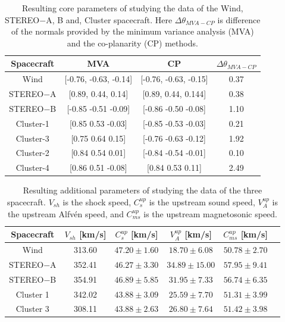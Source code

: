 \documentclass[draft]{agujournal2019}
\begin{document}
\begin{table}[h]
 \centering
 \caption{Resulting core parameters of studying the data of the Wind, STEREO$-$A, B and, Cluster spacecraft. Here $\Delta\theta_{MVA-CP}$ is difference of the normals provided by the minimum variance analysis (MVA) and the co-planarity (CP) methods.\label{tab:core2}}
\begin{tabular}{cccc}
\hline
Spacecraft & MVA & CP & $\Delta\theta_{MVA-CP}$\\
 \hline
Wind & [-0.76, -0.63, -0.14] & [-0.76, -0.63, -0.15] & 0.37 \\
STEREO$-$A & [0.89, 0.44, 0.14] & [0.89, 0.44, 0.144] & 0.38 \\
STEREO$-$B & [-0.85 -0.51 -0.09] &   [-0.86 -0.50 -0.08] & 1.10  \\
Cluster-1 & [0.85 0.53 -0.03] &   [-0.85 -0.53 -0.03] & 0.21  \\
Cluster-3 & [0.75 0.64 0.15] &   [-0.76 -0.63 -0.12] & 1.92  \\
 Cluster-2 & [0.84 0.54 0.01] &   [-0.84 -0.54 -0.01] & 0.10  \\
 Cluster-4 & [0.86 0.51 -0.08] &   [0.84 0.53 0.11] & 2.49  \\
 \end{tabular}
\end{table}

\pagebreak

\begin{table}[h]
\centering
\caption{Resulting additional parameters of studying the data of the three spacecraft. $V_{sh}$ is the shock speed, $C^{up}_s$ is the upstream sound speed, $V^{up}_A$ is the upstream Alfvén speed, and $C^{up}_{ms}$ is the upstream magnetosonic speed. \label{tab:core3}}
\begin{tabular}{cccccc}
\hline
Spacecraft & $V_{sh}$ [km/s] & $C^{up}_s$ [km/s]  & $V^{up}_A$ [km/s] & $C^{up}_{ms}$ [km/s]  \\
 \hline
Wind & 313.60 & $47.20\pm 1.60$     & $18.70\pm 6.08$      & $50.78\pm 2.70$  \\
 STEREO$-$A  & 352.41 & $46.27\pm 3.30$     & $34.89\pm 15.00$      & $57.95\pm 9.41$ \\
STEREO$-$B & 354.91 & $46.89\pm 5.85$     & $31.95\pm 7.33$      & $56.74\pm 6.35$ \\
  Cluster 1  & 342.02 & $43.88\pm 3.09$     & $25.59\pm 7.70$      & $51.31\pm 3.99$  \\
  Cluster 3  & 308.11 & $43.88\pm 2.63$     & $26.80\pm 7.64$  & $51.42\pm 3.98$  \\
\end{tabular}
\end{table}
\end{document}
